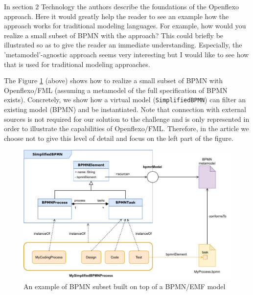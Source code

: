 \documentclass[10pt]{article}
\begin{document}
\begin{response}{In section 2 Technology the authors describe the foundations of the Openflexo approach. Here it would greatly help the reader to see an example how the approach works for traditional modeling languages. For example, how would you realize a small subset of BPMN with the approach? This could briefly be illustrated so as to give the reader an immediate understanding. Especially, the 'metamodel'-agnostic approach seems very interesting but I would like to see how that is used for traditional modeling approaches.}

The Figure \ref{fig:BPMNSubsetExample} (above) shows how to realize a small subset of BPMN with Openflexo/FML (assuming a metamodel of the full specification of BPMN exists). Concretely, we show  how a virtual model (\texttt{SimplifiedBPMN}) can filter an existing model (BPMN) and be instantiated. Note that connection with external sources is not required for our solution to the challenge and is only represented in order to illustrate the capabilities of Openflexo/FML. Therefore, in the article we choose not to give this level of detail and focus on the left part of the figure.


\begin{figure}[t]
    \centering
    \includegraphics[width=1.0 \textwidth]{Figures/BPMNSubsetExampleWithExternalConnexion.pdf}
    \caption{An example of BPMN subset built on top of a BPMN/EMF model}
    \label{fig:BPMNSubsetExample}
\end{figure}



\end{response}
\end{document}
